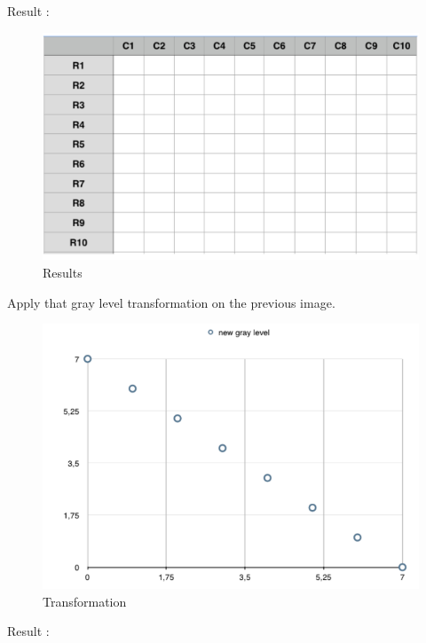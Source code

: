 \documentclass[12pt]{tdtp}
\begin{document}
Result :



\begin{figure}[h!]
	\begin{center}
		\includegraphics[scale=0.5]{images/I3.png}
		\caption{Results}
	\end{center}
\end{figure}

\newpage 
\Exo


Apply that gray level transformation on the previous image.

\begin{figure}[h!]
	\begin{center}
		\includegraphics[scale=0.5]{images/I4.png}
		\caption{Transformation}
	\end{center}
\end{figure}

Result :
\end{document}
